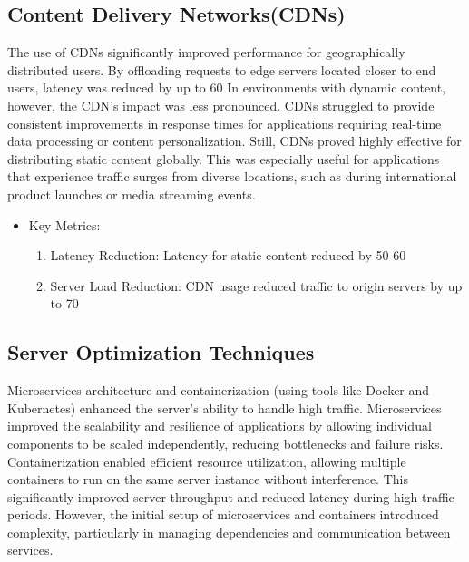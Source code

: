 \documentclass{article}
\begin{document}
\subsection{Content Delivery Networks(CDNs)}
The use of CDNs significantly improved performance for geographically distributed users. By offloading requests to edge servers located closer to end users, latency was reduced by up to 60%
In environments with dynamic content, however, the CDN's impact was less pronounced. CDNs struggled to provide consistent improvements in response times for applications requiring real-time data processing or content personalization.
Still, CDNs proved highly effective for distributing static content globally. This was especially useful for applications that experience traffic surges from diverse locations, such as during international product launches or media streaming events.

\begin{itemize}
    \item Key Metrics:
    \begin{enumerate}
        \item Latency Reduction: Latency for static content reduced by 50-60%
        \item Server Load Reduction: CDN usage reduced traffic to origin servers by up to 70%
    \end{enumerate}
\end{itemize}

\subsection{Server Optimization Techniques}

Microservices architecture and containerization (using tools like Docker and Kubernetes) enhanced the server's ability to handle high traffic. Microservices improved the scalability and resilience of applications by allowing individual components to be scaled independently, reducing bottlenecks and failure risks.
Containerization enabled efficient resource utilization, allowing multiple containers to run on the same server instance without interference. This significantly improved server throughput and reduced latency during high-traffic periods. However, the initial setup of microservices and containers introduced complexity, particularly in managing dependencies and communication between services.
\end{document}
